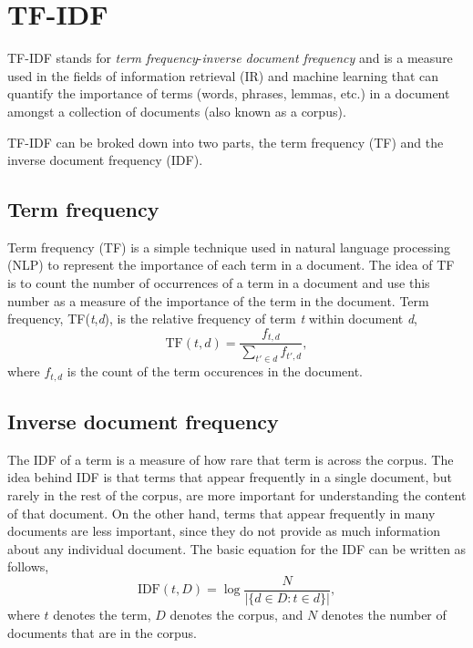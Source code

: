 
\section{TF-IDF}
TF-IDF stands for \textit{term frequency}-\textit{inverse document frequency} and is a measure used in the fields of information retrieval (IR) and machine learning that can quantify the importance of terms (words, phrases, lemmas, etc.) in a document amongst a collection of documents (also known as a corpus). 

TF-IDF can be broked down into two parts, the term frequency (TF) and the inverse document frequency (IDF). 
\subsection*{Term frequency}
Term frequency (TF) is a simple technique used in natural language processing (NLP) to represent the importance of each term in a document. The idea of TF is to count the number of occurrences of a term in a document and use this number as a measure of the importance of the term in the document. Term frequency, TF(\emph{t},\emph{d}), is the relative frequency of term \emph{t} within document \emph{d},
\begin{equation}
    \text{TF}(t,d) = \frac{f_{t,d}}{\sum_{t' \in d}f_{t',d}},
\end{equation}
where $f_{t,d}$ is the count of the term occurences in the document. 
\subsection*{Inverse document frequency}
The IDF of a term is a measure of how rare that term is across the corpus. The idea behind IDF is that terms that appear frequently in a single document, but rarely in the rest of the corpus, are more important for understanding the content of that document. On the other hand, terms that appear frequently in many documents are less important, since they do not provide as much information about any individual document. The basic equation for the IDF can be written as follows,
\begin{equation}
    \text{IDF}(t,D) = \operatorname{log}\frac{N}{|\{d\in D : t\in d\}|} ,
\end{equation}
where $t$ denotes the term, $D$ denotes the corpus, and $N$ denotes the number of documents that are in the corpus.

